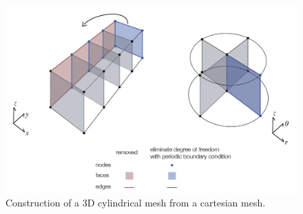 \begin{figure}
    \begin{center}
    \includegraphics[width=0.9\columnwidth]{figures/casing_software/cylwrap.png}
    \end{center}
\caption{Construction of a 3D cylindrical mesh from a cartesian mesh.}
\label{fig:cylwrap}
\end{figure}
